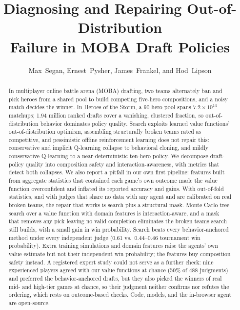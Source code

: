 \documentclass[journal]{IEEEtran}
\newif\ifanonymous
\begin{document}
\title{Diagnosing and Repairing Out-of-Distribution\\ Failure in MOBA Draft Policies}
\ifanonymous
\author{Anonymous Authors}
\else
\author{Max~Segan, Ernest~Pysher, James~Frankel, and Hod~Lipson}
\fi
\maketitle

\begin{abstract}
In multiplayer online battle arena (MOBA) drafting, two teams alternately ban and pick heroes from a shared pool to build competing five-hero compositions, and a noisy match decides the winner. In Heroes of the Storm, a 90-hero pool spans $7.2 \times 10^{14}$ matchups; 1.94 million ranked drafts cover a vanishing, clustered fraction, so out-of-distribution behavior dominates policy quality. Search exploits learned value functions' out-of-distribution optimism, assembling structurally broken teams rated as competitive, and pessimistic offline reinforcement learning does not repair this: conservative and implicit Q-learning collapse to behavioral cloning, and mildly conservative Q-learning to a near-deterministic ten-hero policy. We decompose draft-policy quality into composition safety and interaction-awareness, with metrics that detect both collapses. We also report a pitfall in our own first pipeline: features built from aggregate statistics that contained each game's own outcome made the value function overconfident and inflated its reported accuracy and gains. With out-of-fold statistics, and with judges that share no data with any agent and are calibrated on real broken teams, the repair that works is search plus a structural mask. Monte Carlo tree search over a value function with domain features is interaction-aware, and a mask that removes any pick leaving no valid completion eliminates the broken teams search still builds, with a small gain in win probability. Search beats every behavior-anchored method under every independent judge (0.61 vs.\ 0.44--0.46 tournament win probability). Extra training simulations and domain features raise the agents' own value estimate but not their independent win probability; the features buy composition safety instead. A registered expert study could not serve as a further check: nine experienced players agreed with our value functions at chance (50\% of 488 judgments) and preferred the behavior-anchored drafts, but they also picked the winners of real mid- and high-tier games at chance, so their judgment neither confirms nor refutes the ordering, which rests on outcome-based checks. Code, models, and the in-browser agent are open-source.
\end{abstract}
\end{document}
